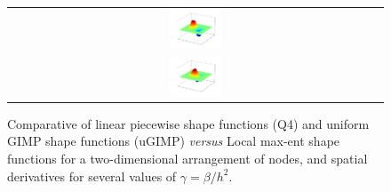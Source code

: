 \begin{figure}
{\begin{tabular}{c}
      \includegraphics[width=0.14\textwidth]{Figures/GIMP_Shape_Fun_dx}\\
      \includegraphics[width=0.14\textwidth]{Figures/GIMP_Shape_Fun_dy}
    \end{tabular}
  }
  \caption{Comparative of linear piecewise shape functions (Q4) and
    uniform GIMP shape functions (uGIMP) \textit{versus} Local max-ent
    shape functions for a two-dimensional arrangement of nodes, and
    spatial derivatives for several values of $\gamma = \beta/h^2$.}
  \label{fig:LME_MPM}
\end{figure}
